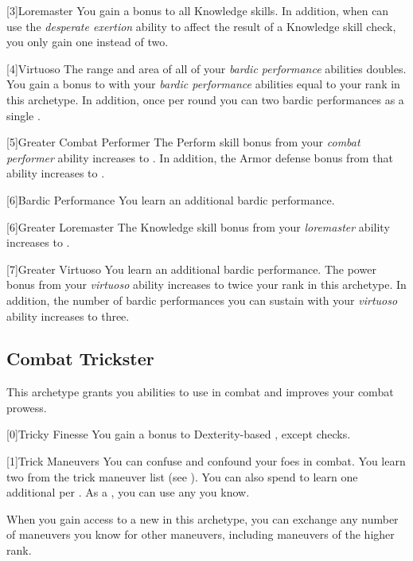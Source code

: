         [3]{Loremaster} You gain a  bonus to all Knowledge skills.
        In addition, when can use the \textit{desperate exertion} ability to affect the result of a Knowledge skill check,
            you only gain one  instead of two.

        [4]{Virtuoso} The range and area of all of your \textit{bardic performance} abilities doubles.
        You gain a bonus to  with your \textit{bardic performance} abilities equal to your rank in this archetype.
        In addition, once per round you can  two bardic performances as a single .

        [5]{Greater Combat Performer} The Perform skill bonus from your \textit{combat performer} ability increases to .
        In addition, the Armor defense bonus from that ability increases to .

        [6]{Bardic Performance} You learn an additional bardic performance.

        [6]{Greater Loremaster} The Knowledge skill bonus from your \textit{loremaster} ability increases to .

        [7]{Greater Virtuoso} You learn an additional bardic performance.
        The power bonus from your \textit{virtuoso} ability increases to twice your rank in this archetype.
        In addition, the number of bardic performances you can sustain with your \textit{virtuoso} ability increases to three.

    \newpage
    \subsection{Combat Trickster}
        This archetype grants you abilities to use in combat and improves your combat prowess.

        [0]{Tricky Finesse} You gain a  bonus to Dexterity-based , except  checks.

        {
            [1]{Trick Maneuvers}
            You can confuse and confound your foes in combat.
            You learn two  from the trick maneuver list (see ).
            You can also spend  to learn one additional  per .
            As a , you can use any  you know.

            When you gain access to a new  in this archetype,
                you can exchange any number of maneuvers you know for other maneuvers,
                including maneuvers of the higher rank.
        }

